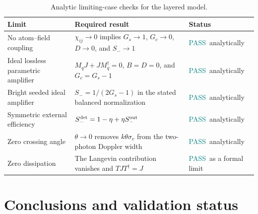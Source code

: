 \documentclass[11pt,a4paper]{article}
\newcommand{\pass}{\textcolor{teal}{PASS}}
\begin{document}
\begin{table}[ht]
\centering
\caption{Analytic limiting-case checks for the layered model.}
\label{tab:limits}
\small
\begin{tabularx}{\textwidth}{L{3.5cm}Y L{2.2cm}}
\toprule
Limit & Required result & Status\\
\midrule
No atom--field coupling &
$\chi_{ij}\to0$ implies $G_s\to1$, $G_c\to0$, $D\to0$, and $S_-\to1$ &
\pass\ analytically\\
Ideal lossless parametric amplifier &
$M_qJ+JM_q^\dagger=0$, $B=D=0$, and $G_c=G_s-1$ &
\pass\ analytically\\
Bright seeded ideal amplifier &
$S_-=1/(2G_s-1)$ in the stated balanced normalization &
\pass\ analytically\\
Symmetric external efficiency &
$S_-^{\rm det}=1-\eta+\eta S_-^{\rm out}$ &
\pass\ analytically\\
Zero crossing angle &
$\theta\to0$ removes $k\theta\sigma_v$ from the two-photon Doppler width &
\pass\ analytically\\
Zero dissipation &
The Langevin contribution vanishes and $TJT^\dagger=J$ &
\pass\ as a formal limit\\
\bottomrule
\end{tabularx}
\end{table}

\clearpage
\section{Conclusions and validation status}
\end{document}
